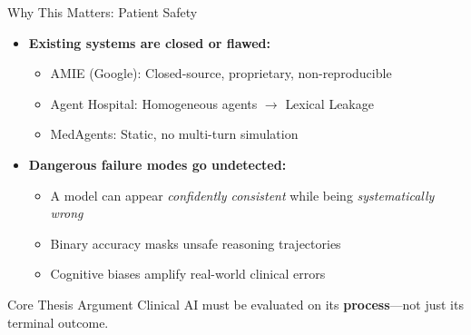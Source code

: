\documentclass[aspectratio=169,11pt]{beamer}
\begin{document}
\begin{frame}{Why This Matters: Patient Safety}
\begin{itemize}
  \item \textbf{Existing systems are closed or flawed:}
  \begin{itemize}
    \item AMIE (Google): Closed-source, proprietary, non-reproducible
    \item Agent Hospital: Homogeneous agents $\rightarrow$ \alert{Lexical Leakage}
    \item MedAgents: Static, no multi-turn simulation
  \end{itemize}
  \vspace{0.5em}
  \item \textbf{Dangerous failure modes go undetected:}
  \begin{itemize}
    \item A model can appear \textit{confidently consistent} while being \textit{systematically wrong}
    \item Binary accuracy masks unsafe reasoning trajectories
    \item Cognitive biases amplify real-world clinical errors
  \end{itemize}
\end{itemize}

\vspace{0.5em}
\begin{block}{Core Thesis Argument}
Clinical AI must be evaluated on its \textbf{process}—not just its terminal outcome.
\end{block}

\end{frame}
\end{document}
